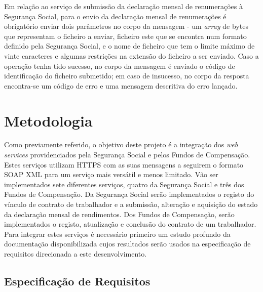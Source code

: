 \documentclass[sigplan]{acmart}
\begin{document}
Em relação ao serviço de submissão da declaração mensal de renumerações à Segurança Social, para o envio da declaração mensal de renumerações é obrigatório enviar dois parâmetros no corpo da mensagem - um \textit{array} de bytes que representam o ficheiro a enviar, ficheiro este que se encontra num formato definido pela Segurança Social, e o nome de ficheiro que tem o limite máximo de vinte caracteres e algumas restrições na extensão do ficheiro a ser enviado. Caso a operação tenha tido sucesso, no corpo da mensagem é enviado o código de identificação do ficheiro submetido; em caso de insucesso, no corpo da resposta encontra-se um código de erro e uma mensagem descritiva do erro lançado.

\section{Metodologia} \label{sec:methods}

Como previamente referido, o objetivo deste projeto é a integração dos \textit{web services} providenciados pela Segurança Social e pelos Fundos de Compensação. Estes serviços utilizam HTTPS com as suas mensagens a seguirem o formato SOAP XML para um serviço mais versátil e menos limitado. Vão ser implementados sete diferentes serviços, quatro da Segurança Social e três dos Fundos de Compensação. Da Segurança Social serão implementados o registo do vínculo de contrato de trabalhador e a submissão, alteração e aquisição do estado da declaração mensal de rendimentos. Dos Fundos de Compensação, serão implementados o registo, atualização e conclusão do contrato de um trabalhador. Para integrar estes serviços é necessário primeiro um estudo profundo da documentação disponibilizada cujos resultados serão usados na especificação de requisitos direcionada a este desenvolvimento.

\subsection{Especificação de Requisitos}
\end{document}
